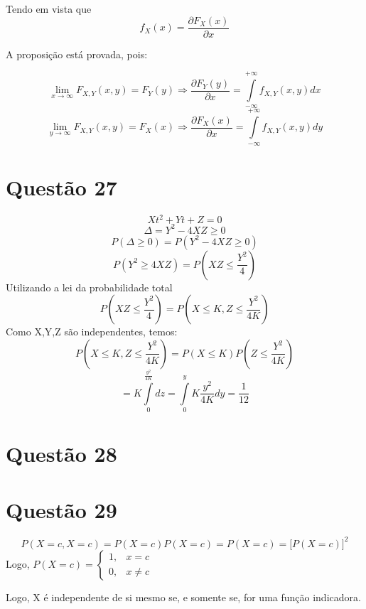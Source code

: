 \documentclass[a4paper,12pt]{report}
\begin{document}
		Tendo em vista que $$f_X(x) = \frac{\partial F_X(x)}{\partial x }  $$ 
		
		A proposição está provada, pois:
		
			$$ \lim\limits_{x\rightarrow \infty} F_{X,Y}(x,y)=F_Y(y)\Rightarrow \frac{\partial F_Y(y)}{\partial x } = \int\limits_{-\infty}^{+\infty} f_{X,Y}(x,y)dx $$
						$$ \lim\limits_{y\rightarrow \infty} F_{X,Y}(x,y)=F_X(x)\Rightarrow \frac{\partial F_X(x)}{\partial x }  = \int\limits_{-\infty}^{+\infty} f_{X,Y}(x,y)dy $$
						
						\newpage 
						
								\section{Questão 27}
								
								$$Xt^2+Yt+Z = 0 $$
								$$\Delta  = Y^2-4XZ\ge 0 $$
								$$P(\Delta \ge 0 ) = P(Y^2 - 4XZ\ge 0 ) $$
								$$P(Y^2 \ge  4XZ) = P(XZ\le \frac{Y^2}{4}) $$
								Utilizando a lei da probabilidade total
								$$P(XZ\le \frac{Y^2}{4})=P(X\le K,Z\le \frac{Y^2}{4K}) $$
								Como X,Y,Z são independentes, temos:
								$$P(X\le K,Z\le \frac{Y^2}{4K}) = P(X\le K)P(Z\le\frac{Y^2}{4K} ) $$
								$$= K\int\limits_0^{\frac{y^2}{4K} } dz = \int\limits_0^y K \frac{y^2}{4K} dy= \frac{1}{12}$$
							\section{Questão 28}
							\newpage 
														\section{Questão 29}
														$$P(X=c,X=c)=P(X=c)P(X=c) = P(X=c)= \bigg[
														P(X=c)
														\bigg]^2 $$
														Logo, $P(X=c) =\begin{cases}
														1, & x=c\\
														0, & x\ne c
														\end{cases}$
														
														Logo, X é independente de si mesmo se, e somente se, for uma função indicadora.
														
\end{document}
